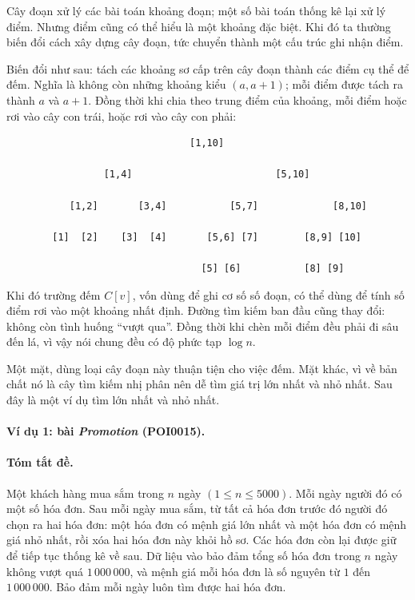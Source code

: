 \documentclass[11pt]{article}
\begin{document}
Cây đoạn xử lý các bài toán khoảng đoạn; một số bài toán thống kê lại xử lý
điểm. Nhưng điểm cũng có thể hiểu là một khoảng đặc biệt. Khi đó ta thường
biến đổi cách xây dựng cây đoạn, tức chuyển thành một cấu trúc ghi nhận điểm.

Biến đổi như sau: tách các khoảng sơ cấp trên cây đoạn thành các điểm cụ thể
để đếm. Nghĩa là không còn những khoảng kiểu \((a,a+1)\); mỗi điểm được tách
ra thành \(a\) và \(a+1\). Đồng thời khi chia theo trung điểm của khoảng, mỗi
điểm hoặc rơi vào cây con trái, hoặc rơi vào cây con phải:

\begin{verbatim}
                                [1,10]

                 [1,4]                         [5,10]

           [1,2]       [3,4]           [5,7]             [8,10]

        [1]  [2]    [3]  [4]       [5,6] [7]        [8,9] [10]

                                  [5] [6]           [8] [9]
\end{verbatim}

Khi đó trường đếm \(C[v]\), vốn dùng để ghi cơ số số đoạn, có thể dùng để tính
số điểm rơi vào một khoảng nhất định. Đường tìm kiếm ban đầu cũng thay đổi:
không còn tình huống ``vượt qua''. Đồng thời khi chèn mỗi điểm đều phải đi sâu
đến lá, vì vậy nói chung đều có độ phức tạp \(\log n\).

Một mặt, dùng loại cây đoạn này thuận tiện cho việc đếm. Mặt khác, vì về bản
chất nó là cây tìm kiếm nhị phân nên dễ tìm giá trị lớn nhất và nhỏ nhất. Sau
đây là một ví dụ tìm lớn nhất và nhỏ nhất.

\paragraph{Ví dụ 1: bài \textit{Promotion} (POI0015).}

\paragraph{Tóm tắt đề.}
Một khách hàng mua sắm trong \(n\) ngày \((1\le n\le 5000)\). Mỗi ngày người
đó có một số hóa đơn. Sau mỗi ngày mua sắm, từ tất cả hóa đơn trước đó người
đó chọn ra hai hóa đơn: một hóa đơn có mệnh giá lớn nhất và một hóa đơn có
mệnh giá nhỏ nhất, rồi xóa hai hóa đơn này khỏi hồ sơ. Các hóa đơn còn lại
được giữ để tiếp tục thống kê về sau. Dữ liệu vào bảo đảm tổng số hóa đơn
trong \(n\) ngày không vượt quá \(1\,000\,000\), và mệnh giá mỗi hóa đơn là
số nguyên từ \(1\) đến \(1\,000\,000\). Bảo đảm mỗi ngày luôn tìm được hai
hóa đơn.
\end{document}
